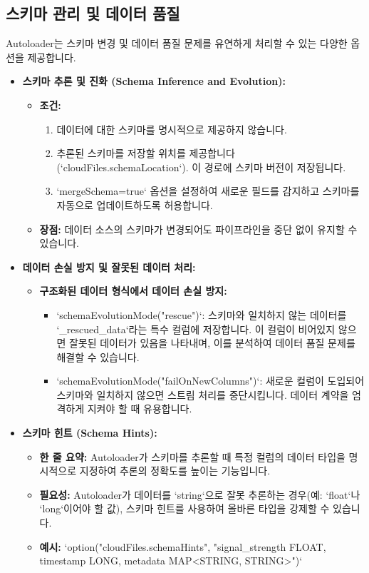 \documentclass[11pt,a4paper]{article}
\begin{document}
\subsection{스키마 관리 및 데이터 품질}
Autoloader는 스키마 변경 및 데이터 품질 문제를 유연하게 처리할 수 있는 다양한 옵션을 제공합니다.

\begin{itemize}
    \item \textbf{스키마 추론 및 진화 (Schema Inference and Evolution):}
    \begin{itemize}
        \item \textbf{조건:}
        \begin{enumerate}
            \item 데이터에 대한 스키마를 명시적으로 제공하지 않습니다.
            \item 추론된 스키마를 저장할 위치를 제공합니다 (`cloudFiles.schemaLocation`). 이 경로에 스키마 버전이 저장됩니다.
            \item `mergeSchema=true` 옵션을 설정하여 새로운 필드를 감지하고 스키마를 자동으로 업데이트하도록 허용합니다.
        \end{enumerate}
        \item \textbf{장점:} 데이터 소스의 스키마가 변경되어도 파이프라인을 중단 없이 유지할 수 있습니다.
    \end{itemize}
    \item \textbf{데이터 손실 방지 및 잘못된 데이터 처리:}
    \begin{itemize}
        \item \textbf{구조화된 데이터 형식에서 데이터 손실 방지:}
        \begin{itemize}
            \item `schemaEvolutionMode("rescue")`: 스키마와 일치하지 않는 데이터를 `_rescued_data`라는 특수 컬럼에 저장합니다. 이 컬럼이 비어있지 않으면 잘못된 데이터가 있음을 나타내며, 이를 분석하여 데이터 품질 문제를 해결할 수 있습니다.
            \item `schemaEvolutionMode("failOnNewColumns")`: 새로운 컬럼이 도입되어 스키마와 일치하지 않으면 스트림 처리를 중단시킵니다. 데이터 계약을 엄격하게 지켜야 할 때 유용합니다.
        \end{itemize}
    \end{itemize}
    \item \textbf{스키마 힌트 (Schema Hints):}
    \begin{itemize}
        \item \textbf{한 줄 요약:} Autoloader가 스키마를 추론할 때 특정 컬럼의 데이터 타입을 명시적으로 지정하여 추론의 정확도를 높이는 기능입니다.
        \item \textbf{필요성:} Autoloader가 데이터를 `string`으로 잘못 추론하는 경우(예: `float`나 `long`이어야 할 값), 스키마 힌트를 사용하여 올바른 타입을 강제할 수 있습니다.
        \item \textbf{예시:} `option("cloudFiles.schemaHints", "signal_strength FLOAT, timestamp LONG, metadata MAP<STRING, STRING>")`
    \end{itemize}
\end{itemize}
\end{document}
